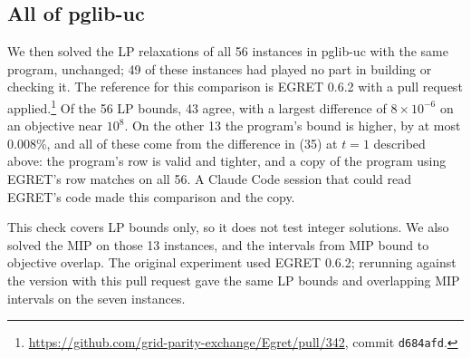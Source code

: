 %

\subsection{All of pglib-uc}
\label{sec:allpglib}

We then solved the LP relaxations of all 56 instances in pglib-uc with the same program, unchanged; 49 of these instances had played no part in building or checking it. The reference for this comparison is EGRET 0.6.2 with a pull request applied.\footnote{\url{https://github.com/grid-parity-exchange/Egret/pull/342}, commit \texttt{d684afd}.} Of the 56 LP bounds, 43 agree, with a largest difference of $8\times 10^{-6}$ on an objective near $10^8$. On the other 13 the program's bound is higher, by at most 0.008\%, and all of these come from the difference in (35) at $t=1$ described above: the program's row is valid and tighter, and a copy of the program using EGRET's row matches on all 56. A Claude Code session that could read EGRET's code made this comparison and the copy.

This check covers LP bounds only, so it does not test integer solutions. We also solved the MIP on those 13 instances, and the intervals from MIP bound to objective overlap. The original experiment used EGRET 0.6.2; rerunning against the version with this pull request gave the same LP bounds and overlapping MIP intervals on the seven instances.

